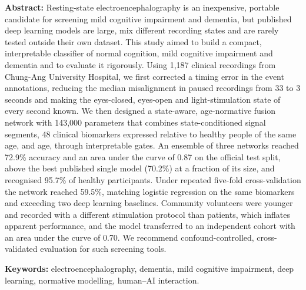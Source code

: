 \noindent\textbf{Abstract:} Resting-state electroencephalography is an inexpensive, portable candidate for
screening mild cognitive impairment and dementia, but published deep learning models are large, mix
different recording states and are rarely tested outside their own dataset. This study aimed to build a
compact, interpretable classifier of normal cognition, mild cognitive impairment and dementia and to evaluate
it rigorously. Using 1,187 clinical recordings from Chung-Ang University Hospital, we first corrected a timing
error in the event annotations, reducing the median misalignment in paused recordings from 33 to 3 seconds
and making the eyes-closed, eyes-open and light-stimulation state of every second known. We then designed a
state-aware, age-normative fusion network with 143,000 parameters that combines state-conditioned signal
segments, 48 clinical biomarkers expressed relative to healthy people of the same age, and age, through
interpretable gates. An ensemble of three networks reached 72.9\% accuracy and an area under the curve of 0.87
on the official test split, above the best published single model (70.2\%) at a fraction of its size, and
recognised 95.7\% of healthy participants. Under repeated five-fold cross-validation the network reached
59.5\%, matching logistic regression on the same biomarkers and exceeding two deep learning baselines.
Community volunteers were younger and recorded with a different stimulation protocol than patients, which
inflates apparent performance, and the model transferred to an independent cohort with an area under the curve
of 0.70. We recommend confound-controlled, cross-validated evaluation for such screening tools.

\vspace{6pt}
\noindent\textbf{Keywords:} electroencephalography, dementia, mild cognitive impairment, deep learning,
normative modelling, human--AI interaction.

